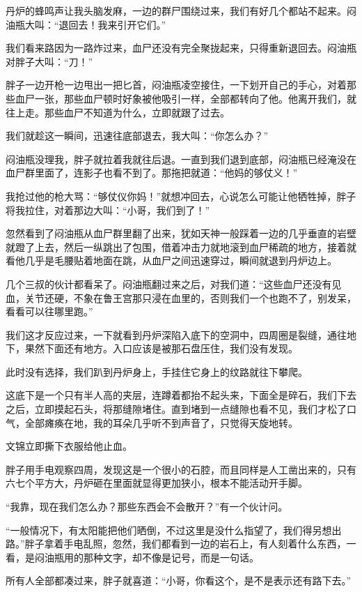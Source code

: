 丹炉的蜂鸣声让我头脑发麻，一边的群尸围绕过来，我们有好几个都站不起来。闷油瓶大叫：“退回去！我来引开它们。”

我们看来路因为一路炸过来，血尸还没有完全聚拢起来，只得重新退回去。闷油瓶对胖子大叫：“刀！”

胖子一边开枪一边甩出一把匕首，闷油瓶凌空接住，一下划开自己的手心，对着那些血尸一张，那些血尸顿时好象被他吸引一样，全部都转向了他。他离开我们，就往上走。那些血尸不知道为什么，立即就跟了过去。

我们就趁这一瞬间，迅速往底部退去，我大叫：“你怎么办？”

闷油瓶没理我，胖子就拉着我就往后退。一直到我们退到底部，闷油瓶已经淹没在血尸群里面了，连影子也看不到了。那拖把就道：“他妈的够仗义！”

我抢过他的枪大骂：“够仗仪你妈！”就想冲回去，心说怎么可能让他牺牲掉，胖子将我拉住，对着那边大叫：“小哥，我们到了！”

忽然看到了闷油瓶从血尸群里翻了出来，犹如天神一般踩着一边的几乎垂直的岩壁就蹬了上去，然后一纵跳出了包围，借着冲击力就地滚到血尸稀疏的地方，接着就看他几乎是毛腰贴着地面在跳，从血尸之间迅速穿过，瞬间就退到丹炉边上。

几个三叔的伙计都看呆了。闷油瓶翻过来之后，对我们道：“这些血尸还没有见血，关节还硬，不象在鲁王宫那只浸在血里的，否则我们一个也跑不了，别发呆，看看可以往哪里跑。”

我们这才反应过来，一下就看到丹炉深陷入底下的空洞中，四周圈是裂缝，通往地下，果然下面还有地方。入口应该是被那石盘压住，我们没有发现。

此时没有选择，我们趴到丹炉身上，手挂住它身上的纹路就往下攀爬。

这底下是一个只有半人高的夹层，连蹲着都抬不起头来，下面全是碎石，我们下去之后，立即摸起石头，将那缝隙堵住。直到堵到一点缝隙也看不见，我们才松了口气，全部瘫痪在地，我的耳朵几乎听不到声音了，只觉得天旋地转。

文锦立即撕下衣服给他止血。

胖子用手电观察四周，发现这是一个很小的石腔，而且同样是人工凿出来的，只有六七个平方大，丹炉砸在里面就显得更加狭小，根本不能活动开手脚。

“我靠，现在我们怎么办？那些东西会不会散开？”有一个伙计问。

“一般情况下，有太阳能把他们晒倒，不过这里是没什么指望了，我们得另想出路。”胖子拿着手电乱照，忽然，我们都看到一边的岩石上，有人刻着什么东西，一看，是闷油瓶用的那种文字，却不像是记号，而是一句话。

所有人全部都凑过来，胖子就喜道：“小哥，你看这个，是不是表示还有路下去。”


